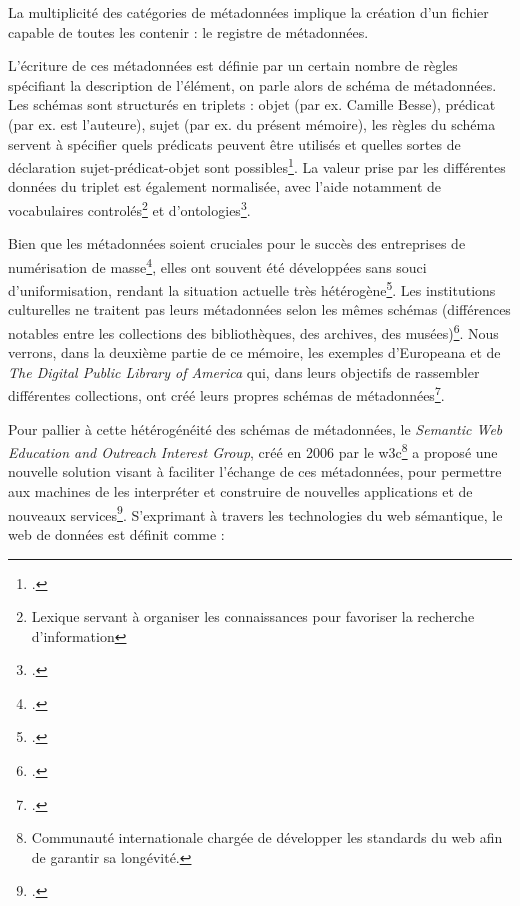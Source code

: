 La multiplicité des catégories de métadonnées implique la création d'un fichier capable de toutes les contenir : le registre de métadonnées.

L'écriture de ces métadonnées est définie par un certain nombre de règles spécifiant la description de l'élément, on parle alors de schéma de métadonnées. Les schémas sont structurés en triplets : objet (par ex. Camille Besse), prédicat (par ex. est l'auteure), sujet (par ex. du présent mémoire), les règles du schéma servent à spécifier quels prédicats peuvent être utilisés et quelles sortes de déclaration sujet-prédicat-objet sont possibles\footcite{pomerantz_metadata_2015}. La valeur prise par les différentes données du triplet est également normalisée, avec l'aide notamment de vocabulaires controlés\footnote{Lexique servant à organiser les connaissances pour favoriser la recherche d'information} et d'ontologies\footnote{\cite{delestre_du_2017}.}. 

Bien que les métadonnées soient cruciales pour le succès des entreprises de numérisation de masse\footcite{pomerantz_metadata_2015}, elles ont souvent été développées sans souci d'uniformisation, rendant la situation actuelle très hétérogène\footcite{rasmussen_pennington_connecting_2019}. Les institutions culturelles ne traitent pas leurs métadonnées selon les mêmes schémas (différences notables entre les collections des bibliothèques, des archives, des musées)\footcite{bermes_web_2013}. Nous verrons, dans la deuxième partie de ce mémoire, les exemples d'Europeana et de \textit{The Digital Public Library of America} qui, dans leurs objectifs de rassembler différentes collections, ont créé leurs propres schémas de métadonnées\footcite{pomerantz_metadata_2015}.

Pour pallier à cette hétérogénéité des schémas de métadonnées, le \textit{Semantic Web Education and Outreach Interest Group}, créé en 2006 par le \gls{w3c}\footnote{Communauté internationale chargée de développer les standards du web afin de garantir sa longévité.} a proposé une nouvelle solution visant à faciliter l'échange de ces métadonnées, pour permettre aux machines de les interpréter et construire de nouvelles applications et de nouveaux services\footcite{bermes_web_2013}. S'exprimant à travers les technologies du web sémantique, le web de données est définit comme : 

